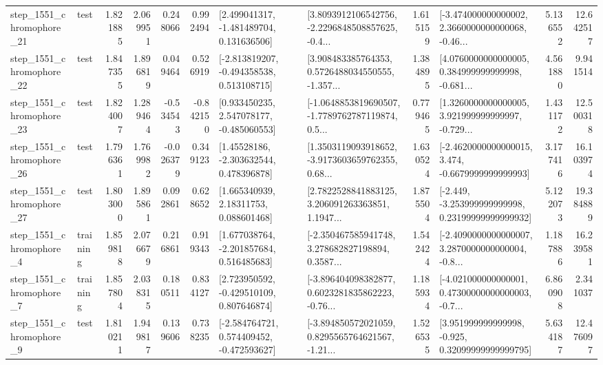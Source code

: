 \begin{tabular}{llrrrrllrlrr}
 step\_1551\_chromophore\_21 &      test &      1.821885 &    2.069951 &      0.248066 &  0.992494 &    [2.499041317, -1.481489704, 0.131636506] &  [3.8093912106542756, -2.2296848508857625, -0.4... &       1.615159 &  [-3.474000000000002, 2.3660000000000068, -0.46... &            5.136552 &         12.642517 \\
 step\_1551\_chromophore\_22 &      test &      1.847355 &    1.896819 &      0.049464 &  0.526919 &   [-2.813819207, -0.494358538, 0.513108715] &  [3.908483385764353, 0.5726488034550555, -1.357... &       1.384895 &  [4.0760000000000005, 0.384999999999998, -0.681... &            4.561880 &          9.941514 \\
 step\_1551\_chromophore\_23 &      test &      1.824007 &    1.289464 &     -0.534543 & -0.842150 &    [0.933450235, 2.547078177, -0.485060553] &  [-1.0648853819690507, -1.7789762787119874, 0.5... &       0.779465 &  [1.3260000000000005, 3.921999999999997, -0.729... &            1.431172 &         12.500318 \\
 step\_1551\_chromophore\_26 &      test &      1.796361 &    1.769982 &     -0.026379 &  0.349123 &     [1.45528186, -2.303632544, 0.478396878] &  [1.3503119093918652, -3.9173603659762355, 0.68... &       1.630524 &  [-2.4620000000000015, 3.474, -0.6679999999999993] &            3.177416 &         16.103974 \\
 step\_1551\_chromophore\_27 &      test &      1.803000 &    1.895861 &      0.092861 &  0.628652 &      [1.665340939, 2.18311753, 0.088601468] &  [2.7822528841883125, 3.206091263363851, 1.1947... &       1.875504 &  [-2.449, -3.253999999999998, 0.23199999999999932] &            5.122073 &         19.384889 \\
  step\_1551\_chromophore\_4 &  training &      1.859818 &    2.076679 &      0.216861 &  0.919343 &    [1.677038764, -2.201857684, 0.516485683] &  [-2.350467585941748, 3.278682827198894, 0.3587... &       1.542424 &  [-2.4090000000000007, 3.2870000000000004, -0.8... &            1.187886 &         16.239581 \\
  step\_1551\_chromophore\_7 &  training &      1.857804 &    2.038315 &      0.180511 &  0.834127 &    [2.723950592, -0.429510109, 0.807646874] &  [-3.896404098382877, 0.6023281835862223, -0.76... &       1.185934 &  [-4.021000000000001, 0.47300000000000003, -0.7... &            6.860908 &          2.341037 \\
  step\_1551\_chromophore\_9 &      test &      1.810211 &    1.949817 &      0.139606 &  0.738235 &   [-2.584764721, 0.574409452, -0.472593627] &  [-3.894850572021059, 0.8295565764621567, -1.21... &       1.526535 &   [3.951999999999998, -0.925, 0.32099999999999795] &            5.634187 &         12.476097 \\

\end{tabular}
